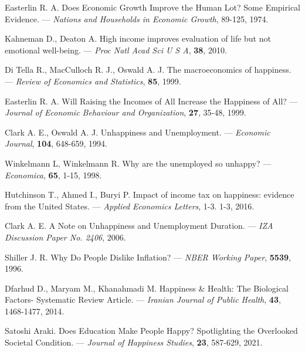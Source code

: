 \documentclass[russian]{vegareport}
\begin{document}
    \begin{thebibliography}{100}
            \bibitem{[1]} \label{Easterlin}
            Easterlin R. A.
            Does Economic Growth Improve the Human Lot? Some Empirical Evidence.
            --- \textit{Nations and Households in Economic Growth}, 
            89-125, 1974.

            \bibitem{} \label{KahnemanDeaton}
            Kahneman D., Deaton A. 
            High income improves evaluation of life but not emotional well-being. 
            --- \textit{Proc Natl Acad Sci U S A},
            \textbf{38}, 2010.

            \bibitem{} \label{DiTella}
            Di Tella R., MacCulloch R. J., Oswald A. J.
            The macroeconomics of happiness. 
           --- \textit{Review of Economics and Statistics}, 
            \textbf{85}, 1999. 

            \bibitem{} \label{Easterlin2}
            Easterlin R. A.
            Will Raising the Incomes of All Increase the Happiness of All?
            --- \textit{Journal of Economic Behaviour and Organization},
            \textbf{27}, 35-48, 1999. 

            \bibitem{} \label{Clark}
            Clark A. E., Oswald A. J.
            Unhappiness and Unemployment.
            --- \textit{Economic Journal}, 
            \textbf{104}, 648-659, 1994. 

            \bibitem{} \label{Winkelmann}
            Winkelmann L, Winkelmann R.
            Why are the unemployed so unhappy?
            --- \textit{Economica}, 
            \textbf{65}, 1-15, 1998. 

            \bibitem{} \label{tax}
            Hutchinson T., Ahmed I., Buryi P.
            Impact of income tax on happiness: evidence from the United States. 
            --- \textit{Applied Economics Letters}, 1-3.
            1-3, 2016.

            \bibitem{} \label{Clarkunemp}
            Clark A. E.
            A Note on Unhappiness and Unemployment Duration.
            --- \textit{IZA Discussion Paper No. 2406}, 
            2006. 
            
            \bibitem{} \label{Inflation}
            Shiller J. R.
            Why Do People Dislike Inflation?
            --- \textit{NBER Working Paper}, 
            \textbf{5539}, 1996. 

            \bibitem{} \label{medicine}
            Dfarhud D., Maryam M., Khanahmadi M. 
            Happiness & Health: The Biological Factors- Systematic Review Article.
            --- \textit{Iranian Journal of Public Health}, 
            \textbf{43}, 1468-1477, 2014. 

            \bibitem{} \label{Education}
            Satoshi Araki.
            Does Education Make People Happy? Spotlighting the Overlooked Societal Condition.
            --- \textit{Journal of Happiness Studies}, 
            \textbf{23}, 587-629, 2021. 
        \end{thebibliography}
\end{document}
